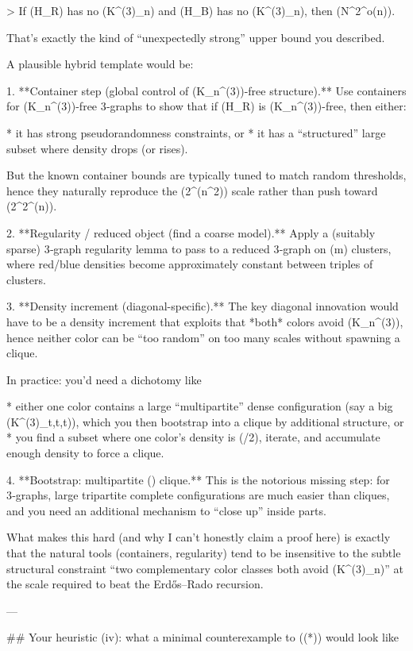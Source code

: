 > If (H_R) has no (K^{(3)}_n) and (H_B) has no (K^{(3)}_n), then (N^{2^{o(n)}}).

That’s exactly the kind of “unexpectedly strong” upper bound you described.

A plausible hybrid template would be:

1. **Container step (global control of (K_n^{(3)})-free structure).**
Use containers for (K_n^{(3)})-free 3‑graphs to show that if (H_R) is (K_n^{(3)})-free, then either:

* it has strong pseudorandomness constraints, or
* it has a “structured” large subset where density drops (or rises).

But the known container bounds are typically tuned to match random thresholds, hence they naturally reproduce the (2^{\Theta(n^2)}) scale rather than push toward (2^{2^{\Theta(n)}}).

2. **Regularity / reduced object (find a coarse model).**
Apply a (suitably sparse) 3‑graph regularity lemma to pass to a reduced 3‑graph on (m) clusters, where red/blue densities become approximately constant between triples of clusters.

3. **Density increment (diagonal-specific).**
The key diagonal innovation would have to be a density increment that exploits that *both* colors avoid (K_n^{(3)}), hence neither color can be “too random” on too many scales without spawning a clique.

In practice: you’d need a dichotomy like

* either one color contains a large “multipartite” dense configuration (say a big (K^{(3)}_{t,t,t})), which you then bootstrap into a clique by additional structure, or
* you find a subset where one color’s density is (/2), iterate, and accumulate enough density to force a clique.

4. **Bootstrap: multipartite (\Rightarrow) clique.**
This is the notorious missing step: for 3‑graphs, large tripartite complete configurations are much easier than cliques, and you need an additional mechanism to “close up” inside parts.

What makes this hard (and why I can’t honestly claim a proof here) is exactly that the natural tools (containers, regularity) tend to be insensitive to the subtle structural constraint “two complementary color classes both avoid (K^{(3)}_n)” at the scale required to beat the Erdős–Rado recursion.

---

## Your heuristic (iv): what a minimal counterexample to ((*)) would look like

